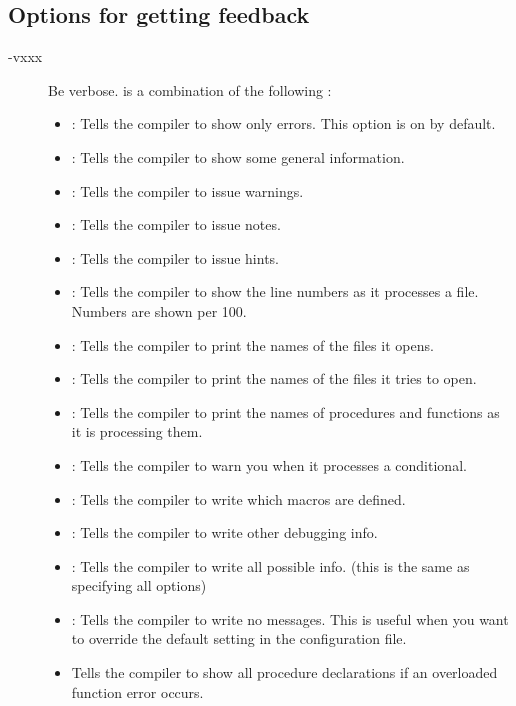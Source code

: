 \documentclass{report}
\newcommand{\olabel}[1]{\label{option:#1}}
\begin{document}
%
%
\subsection{Options for getting feedback}
\begin{description}
\item[-vxxx] Be verbose.  is a combination of the following :
\olabel{v}
\begin{itemize}
\item {} : Tells the compiler to show only errors. This option is on by default.
\item {} : Tells the compiler to show some general information.
\item {} : Tells the compiler to issue warnings.
\item {} : Tells the compiler to issue notes.
\item {} : Tells the compiler to issue hints.
\item {} : Tells the compiler to show the line numbers as it processes a
file. Numbers are shown per 100.
\item {} : Tells the compiler to print the names of the files it opens.
\item {} : Tells the compiler to print the names of the files it tries
to open. 
\item {} : Tells the compiler to print the names of procedures and
functions as it is processing them.
\item {} : Tells the compiler to warn you when it processes a
conditional.
\item {} : Tells the compiler to write which macros are defined.
\item {} : Tells the compiler to write other debugging info.
\item {} : Tells the compiler to write all possible info. (this is the
same as specifying all options)
\item {} : Tells the compiler to write no messages. This is useful when
you want to override the default setting in the configuration file.
\item {} Tells the compiler to show all procedure declarations if an
overloaded function error occurs.
\end{itemize}
\end{description}

%
%
\end{document}
